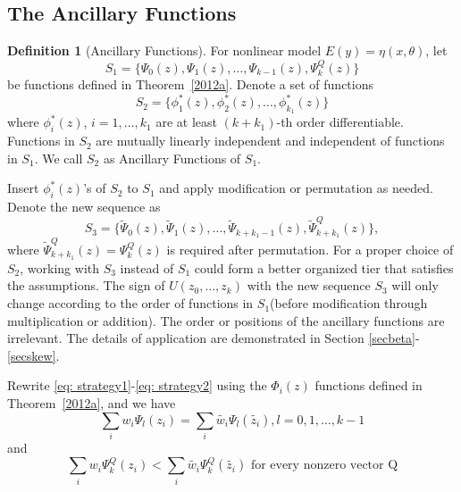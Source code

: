\documentclass[12pt]{amsart}
\theoremstyle{definition}
\newtheorem{definition}{Definition}[section]
\theoremstyle{remark}
\numberwithin{equation}{section}
\begin{document}




\subsection{The Ancillary Functions} 
\begin{definition}[Ancillary Functions]\label{anci}
    For nonlinear model $E(y) = \eta(x,\theta)$, let \[S_1 = \{\Psi_0(z), \Psi_1(z), \ldots,\Psi_{k-1}(z) ,\Psi_k^Q(z)\}\] be functions defined in Theorem~\ref{2012a}. Denote a set of functions \[ S_2 =\{\phi^*_1(z), \phi^*_2(z),\ldots, \phi^*_{k_1}(z)\}\] where $\phi^*_i(z)$, $i=1,\ldots,k_1$ are at least $(k+k_1)$-th order differentiable. Functions in $S_2$ are mutually linearly independent and independent of functions in $S_1$. We call $S_2$ as Ancillary Functions of $S_1$.
\end{definition}

  Insert $\phi_i^*(z)$'s of $S_2$ to $S_1$ and apply modification or permutation as needed. Denote the new sequence as  \[S_3 = \{\tilde{\Psi}_0(z), \tilde{\Psi}_1(z), \ldots,\tilde{\Psi}_{k+k_1-1}(z), \tilde{\Psi}_{k+k_1}^Q(z)\},\]
  where $\tilde{\Psi}_{k+k_1}^Q(z) = \Psi_{k}^Q(z)$ is required after permutation. For a proper choice of $S_2$, working with $S_3$ instead of $S_1$ could form a better organized tier that satisfies the assumptions. The sign of $U(z_0,\ldots,z_k)$ with the new sequence $S_3$ will only change according to the order of functions in $S_1$(before modification through multiplication or addition). The order or positions of the ancillary functions are irrelevant. The details of application are demonstrated in Section \ref{secbeta}-\ref{secskew}.


Rewrite \eqref{eq: strategy1}-\eqref{eq: strategy2} using the $\Phi_i(z)$ functions defined in Theorem~\ref{2012a}, and we have
\begin{equation} \label{eq: st1}
\sum_{i}w_i\Psi_l(z_i)=\sum_{i}\tilde{w_i}\Psi_l(\tilde{z_i}), l=0,1,\ldots, k-1
\end{equation} and \begin{equation} \label{eq: st2}
\sum_{i}w_i\Psi_k^Q(z_i)<\sum_{i}\tilde{w_i}\Psi_k^Q(\tilde{z_i}) \text{  for every nonzero vector Q}
\end{equation}  
\end{document}

